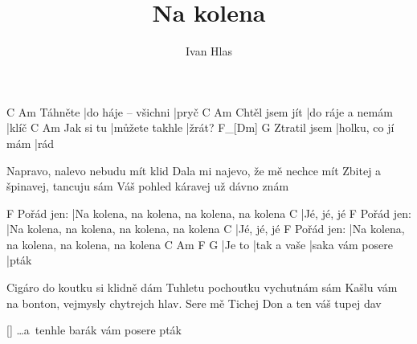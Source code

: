 \documentclass{song}
\title{Na kolena}
\author{Ivan Hlas}
\begin{document}
\strophe
        C                   Am
Táhněte |do háje -- všichni |pryč
               C                Am
Chtěl jsem jít |do ráje a nemám |klíč
          C              Am
Jak si tu |můžete takhle |žrát?
             F_[Dm]            G
Ztratil jsem |holku, co jí mám |rád
\endstrophe

\strophe*
Napravo, nalevo nebudu mít klid
Dala mi najevo, že mě nechce mít
Zbitej a špinavej, tancuju sám
Váš pohled káravej už dávno znám
\endstrophe

           F
Pořád jen: |Na kolena, na kolena, na kolena, na kolena
C
|Jé, jé, jé
           F
Pořád jen: |Na kolena, na kolena, na kolena, na kolena
C
|Jé, jé, jé
           F
Pořád jen: |Na kolena, na kolena, na kolena, na kolena
C      Am          F                G
|Je to |tak a vaše |saka vám posere |pták
\endstrophe

\strophe*
Cigáro do koutku si klidně dám
Tuhletu pochoutku vychutnám sám
Kašlu vám na bonton, vejmysly chytrejch hlav.
Sere mě Tichej Don a ten váš tupej dav
\endstrophe

\ref{} \ldots a~tenhle barák vám posere pták
\end{document}
